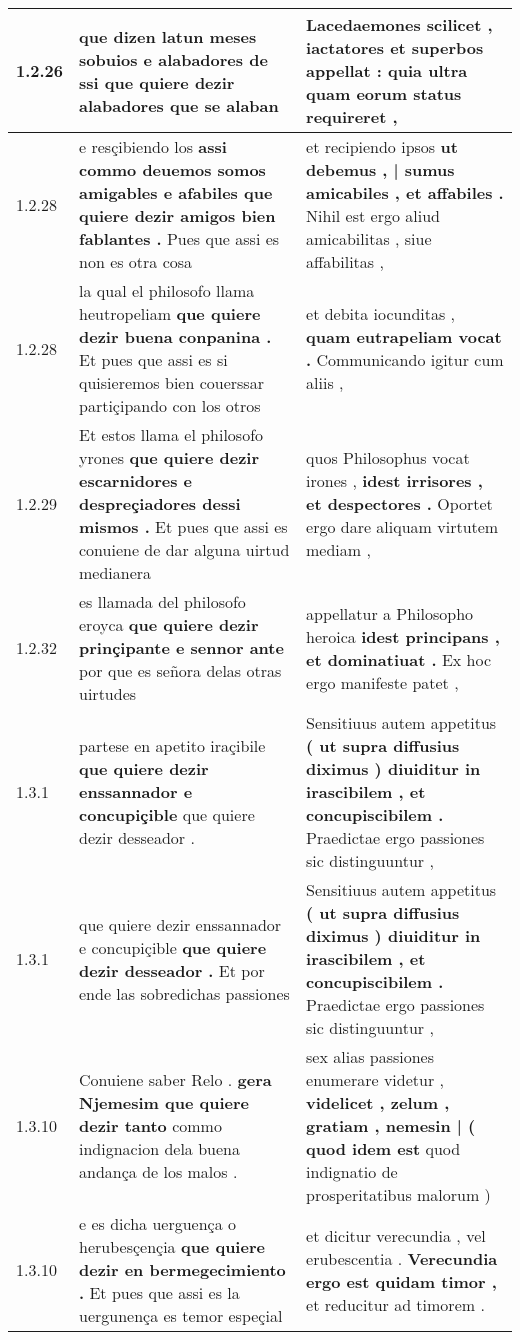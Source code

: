 \begin{tabular}{|p{1cm}|p{6.5cm}|p{6.5cm}|}
1.2.26 & que dizen latun meses sobuios e alabadores de ssi \textbf{ que quiere dezir alabadores } que se alaban & Lacedaemones scilicet , \textbf{ iactatores et superbos appellat : } quia ultra quam eorum status requireret , \\\hline
1.2.28 & e resçibiendo los \textbf{ assi commo deuemos somos amigables e afabiles que quiere dezir amigos bien fablantes . } Pues que assi es non es otra cosa & et recipiendo ipsos \textbf{ ut debemus , | sumus amicabiles , et affabiles . } Nihil est ergo aliud amicabilitas , siue affabilitas , \\\hline
1.2.28 & la qual el philosofo llama heutropeliam \textbf{ que quiere dezir buena conpanina . } Et pues que assi es si quisieremos bien couerssar partiçipando con los otros & et debita iocunditas , \textbf{ quam eutrapeliam vocat . } Communicando igitur cum aliis , \\\hline
1.2.29 & Et estos llama el philosofo yrones \textbf{ que quiere dezir escarnidores e despreçiadores dessi mismos . } Et pues que assi es conuiene de dar alguna uirtud medianera & quos Philosophus vocat irones , \textbf{ idest irrisores , et despectores . } Oportet ergo dare aliquam virtutem mediam , \\\hline
1.2.32 & es llamada del philosofo eroyca \textbf{ que quiere dezir prinçipante e sennor ante } por que es señora delas otras uirtudes & appellatur a Philosopho heroica \textbf{ idest principans , et dominatiuat . } Ex hoc ergo manifeste patet , \\\hline
1.3.1 & partese en apetito iraçibile \textbf{ que quiere dezir enssannador e concupiçible } que quiere dezir desseador . & Sensitiuus autem appetitus \textbf{ ( ut supra diffusius diximus ) diuiditur in irascibilem , et concupiscibilem . } Praedictae ergo passiones sic distinguuntur , \\\hline
1.3.1 & que quiere dezir enssannador e concupiçible \textbf{ que quiere dezir desseador . } Et por ende las sobredichas passiones & Sensitiuus autem appetitus \textbf{ ( ut supra diffusius diximus ) diuiditur in irascibilem , et concupiscibilem . } Praedictae ergo passiones sic distinguuntur , \\\hline
1.3.10 & Conuiene saber Relo . \textbf{ gera Njemesim que quiere dezir tanto } commo indignacion dela buena andança de los malos . & sex alias passiones enumerare videtur , \textbf{ videlicet , zelum , gratiam , nemesin | ( quod idem est } quod indignatio de prosperitatibus malorum ) \\\hline
1.3.10 & e es dicha uerguença o herubesçençia \textbf{ que quiere dezir en bermegecimiento . } Et pues que assi es la uergunença es temor espeçial & et dicitur verecundia , vel erubescentia . \textbf{ Verecundia ergo est quidam timor , } et reducitur ad timorem . \\\hline

\end{tabular}
